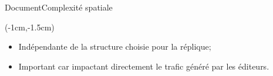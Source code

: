 \begin{frame}{Document}{Complexité spatiale}
  \vspace{1cm}
  
  \begin{textblock*}{\textwidth}(-1cm,-1.5cm) 
    \begin{table}[H]
      
    \end{table}
  \end{textblock*}
  
  \vspace{2cm}
  
  \begin{itemize}
  \item Indépendante de la structure choisie pour la réplique;
    \vspace{0.5cm}
  \item Important car impactant directement le trafic généré par
    les éditeurs.
  \end{itemize}
  
  
\end{frame}


